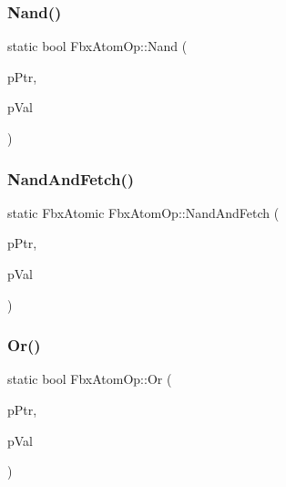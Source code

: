 \mbox{\label{class_fbx_atom_op_ae28cca443f51ae79622f9b76693f7de7}} 
\subsubsection{\texorpdfstring{Nand()}{Nand()}}
{\footnotesize\ttfamily static bool Fbx\+Atom\+Op\+::\+Nand (\begin{DoxyParamCaption}\item[{volatile Fbx\+Atomic $\ast$}]{p\+Ptr,  }\item[{Fbx\+Atomic}]{p\+Val }\end{DoxyParamCaption})\hspace{0.3cm}{\ttfamily [static]}}

\mbox{\label{class_fbx_atom_op_a8f19ff95efc360c5b404e780182c9c66}} 
\subsubsection{\texorpdfstring{Nand\+And\+Fetch()}{NandAndFetch()}}
{\footnotesize\ttfamily static Fbx\+Atomic Fbx\+Atom\+Op\+::\+Nand\+And\+Fetch (\begin{DoxyParamCaption}\item[{volatile Fbx\+Atomic $\ast$}]{p\+Ptr,  }\item[{Fbx\+Atomic}]{p\+Val }\end{DoxyParamCaption})\hspace{0.3cm}{\ttfamily [static]}}

\mbox{\label{class_fbx_atom_op_ad81d13985005870d9274424b03a5702b}} 
\subsubsection{\texorpdfstring{Or()}{Or()}}
{\footnotesize\ttfamily static bool Fbx\+Atom\+Op\+::\+Or (\begin{DoxyParamCaption}\item[{volatile Fbx\+Atomic $\ast$}]{p\+Ptr,  }\item[{Fbx\+Atomic}]{p\+Val }\end{DoxyParamCaption})\hspace{0.3cm}{\ttfamily [static]}}


